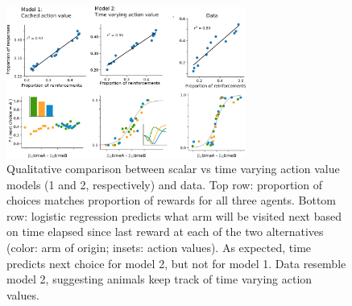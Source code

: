 \begin{figure}%
    \centering
    \includegraphics[width=0.7\textwidth]{flux/02_model.png}%
    \caption{Qualitative comparison between scalar vs time varying action value models (1 and 2, respectively) and data. Top row: proportion of choices matches proportion of rewards for all three agents. Bottom row: logistic regression predicts what arm will be visited next based on time elapsed since last reward at each of the two alternatives (color: arm of origin; insets: action values). As expected, time predicts next choice for model 2, but not for model 1. Data resemble model 2, suggesting animals keep track of time varying action values.}
    \label{fig:flux_model}%
\end{figure}


